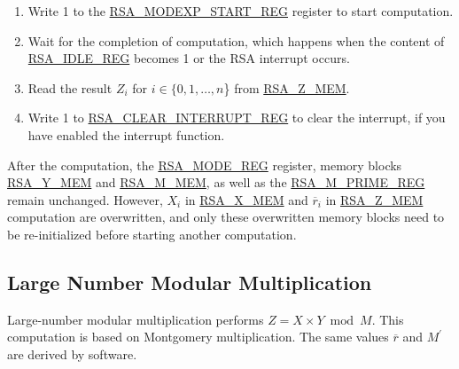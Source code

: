 \documentclass[main\_\_EN.tex]{subfiles}
\begin{document}
\begin{enumerate}
       Users need to write data to each memory block only according to the length of the number; data beyond this length are ignored.

    \item Write 1 to the \hyperref[regdesc:RSAMODEXPSTARTREG]{RSA\_MODEXP\_START\_REG} register to start computation.

    \item Wait for the completion of computation, which happens when the content of \hyperref[regdesc:RSAIDLEREG]{RSA\_IDLE\_REG} becomes 1 or the RSA interrupt occurs.

    \item Read the result \begin{math}Z_{i}\end{math}
        for \begin{math}i \in \{ 0, 1, \dots, n \end{math}\}
        from \hyperref[regdesc:RSAmemory]{RSA\_Z\_MEM}.

    \item Write 1 to \hyperref[regdesc:RSACLEARINTERRUPTREG]{RSA\_CLEAR\_INTERRUPT\_REG} to clear the interrupt, if you have enabled the interrupt function.

\end{enumerate}

After the computation, the \hyperref[regdesc:RSAMODEREG]{RSA\_MODE\_REG} register, memory blocks \hyperref[regdesc:RSAmemory]{RSA\_Y\_MEM} and \hyperref[regdesc:RSAmemory]{RSA\_M\_MEM}, as well as the \hyperref[regdesc:RSAMPRIMEREG]{RSA\_M\_PRIME\_REG} remain unchanged. However, \begin{math}X_{i}\end{math} in \hyperref[regdesc:RSAmemory]{RSA\_X\_MEM} and \begin{math}\overline{r}_{i}\end{math} in \hyperref[regdesc:RSAmemory]{RSA\_Z\_MEM} computation are overwritten, and only these overwritten memory blocks need to be re-initialized before starting another computation.

\subsection{Large Number Modular Multiplication}

Large-number modular multiplication performs \begin{math}Z = X \times Y \bmod M\end{math}. This computation is based on Montgomery multiplication. The same values \begin{math}\overline{r}\end{math} and
\begin{math}M^{\prime}\end{math} are derived by software.
\end{document}
